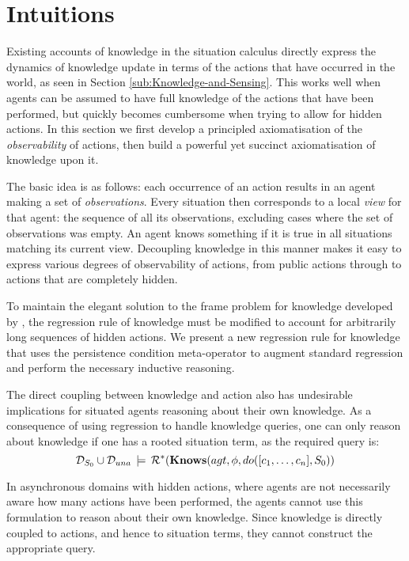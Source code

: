 \section{Intuitions}

Existing accounts of knowledge in the situation calculus directly
express the dynamics of knowledge update in terms of the actions that
have occurred in the world, as seen in Section \ref{sub:Knowledge-and-Sensing}.
This works well when agents can be assumed to have full knowledge
of the actions that have been performed, but quickly becomes cumbersome
when trying to allow for hidden actions. In this section we first
develop a principled axiomatisation of the \emph{observability} of
actions, then build a powerful yet succinct axiomatisation of knowledge
upon it.

The basic idea is as follows: each occurrence of an action results
in an agent making a set of \emph{observations}. Every situation then
corresponds to a local \emph{view} for that agent: the sequence of
all its observations, excluding cases where the set of observations
was empty. An agent knows something if it is true in all situations
matching its current view. Decoupling knowledge in this manner makes
it easy to express various degrees of observability of actions, from
public actions through to actions that are completely hidden.

To maintain the elegant solution to the frame problem for knowledge
developed by \citet{scherl03sc_knowledge}, the regression rule of
knowledge must be modified to account for arbitrarily long sequences
of hidden actions. We present a new regression rule for knowledge
that uses the persistence condition meta-operator to augment standard
regression and perform the necessary inductive reasoning.

The direct coupling between knowledge and action also has undesirable
implications for situated agents reasoning about their own knowledge.
As a consequence of using regression to handle knowledge queries,
one can only reason about knowledge if one has a rooted situation
term, as the required query is:\[
\mathcal{D}_{S_{0}}\cup\mathcal{D}_{una}\,\models\,\mathcal{R}^{*}(\mathbf{Knows}(agt,\phi,do([c_{1},\dots,c_{n}],S_{0}))\]


In asynchronous domains with hidden actions, where agents are not
necessarily aware how many actions have been performed, the agents
cannot use this formulation to reason about their own knowledge. Since
knowledge is directly coupled to actions, and hence to situation terms,
they cannot construct the appropriate query.

